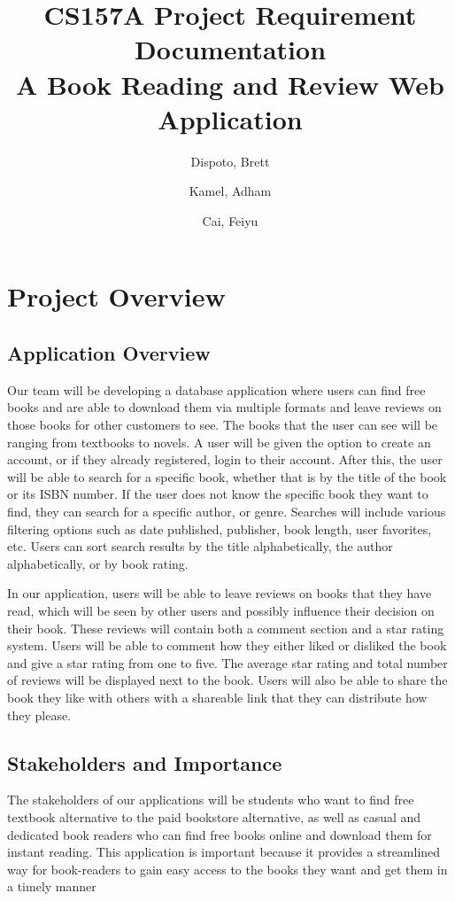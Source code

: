 \documentclass[letter, 12pt, titlepage]{article}
\author{ Dispoto, Brett\\
        \and
        Kamel, Adham\\
        \and
        Cai, Feiyu\\
}
\title{CS157A Project Requirement Documentation \\
        \large A Book Reading and Review Web Application}
\begin{document}
  \maketitle
        \section{Project Overview}
        \subsection{Application Overview}
        Our team will be developing a database application where users can find free books and are able to download them via multiple formats and leave reviews on those books for other customers to see. The books that the user can see will be ranging from textbooks to novels. A user will be given the option to create an account, or if they already registered, login to their account. After this, the user will be able to search for a specific book, whether that is by the title of the book or its ISBN number. If the user does not know the specific book they want to find, they can search for a specific author, or genre. Searches will include various filtering options such as date published, publisher, book length, user favorites, etc. Users can sort search results by the title alphabetically, the author alphabetically, or by book rating.

\medskip
        In our application, users will be able to leave reviews on books that they have read, which will be seen by other users and possibly influence their decision on their book. These reviews will contain both a comment section and a star rating system. Users will be able to comment how they either liked or disliked the book and give a star rating from one to five. The average star rating and total number of reviews will be displayed next to the book. Users will also be able to share the book they like with others with a shareable link that they can distribute how they please.
        \subsection{Stakeholders and Importance}
        The stakeholders of our applications will be students who want to find free textbook alternative to the paid bookstore alternative, as well as casual and dedicated book readers who can find free books online and download them for instant reading. This application is important because it provides a streamlined way for book-readers to gain easy access to the books they want and get them in a timely manner
\end{document}
